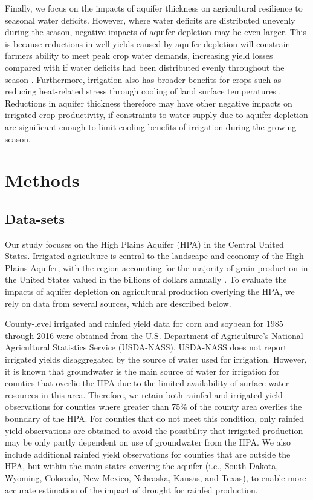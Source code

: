 \documentclass[
]{article}
\begin{document}
Finally, we focus on the impacts of aquifer thickness on agricultural resilience to seasonal water deficits. However, where water deficits are distributed unevenly during the season, negative impacts of aquifer depletion may be even larger. This is because reductions in well yields caused by aquifer depletion will constrain farmers ability to meet peak crop water demands, increasing yield losses compared with if water deficits had been distributed evenly throughout the season \citep{ortiz2019unpacking}. Furthermore, irrigation also has broader benefits for crops such as reducing heat-related stress through cooling of land surface temperatures \citep{adegoke2003impact, bonfils2007empirical, lobell2008effect, zhu2022untangling}. Reductions in aquifer thickness therefore may have other negative impacts on irrigated crop productivity, if constraints to water supply due to aquifer depletion are significant enough to limit cooling benefits of irrigation during the growing season.

\hypertarget{methods}{%
\section{Methods}\label{methods}}

\hypertarget{data-sets}{%
\subsection{Data-sets}\label{data-sets}}

Our study focuses on the High Plains Aquifer (HPA) in the Central United States. Irrigated agriculture is central to the landscape and economy of the High Plains Aquifer, with the region accounting for the majority of grain production in the United States valued in the billions of dollars annually \citep[ \citet{smidt2016complex}]{fenichel2016measuring}. To evaluate the impacts of aquifer depletion on agricultural production overlying the HPA, we rely on data from several sources, which are described below.

County-level irrigated and rainfed yield data for corn and soybean for 1985 through 2016 were obtained from the U.S. Department of Agriculture's National Agricultural Statistics Service (USDA-NASS). USDA-NASS does not report irrigated yields disaggregated by the source of water used for irrigation. However, it is known that groundwater is the main source of water for irrigation for counties that overlie the HPA due to the limited availability of surface water resources in this area. Therefore, we retain both rainfed and irrigated yield observations for counties where greater than 75\% of the county area overlies the boundary of the HPA. For counties that do not meet this condition, only rainfed yield observations are obtained to avoid the possibility that irrigated production may be only partly dependent on use of groundwater from the HPA. We also include additional rainfed yield observations for counties that are outside the HPA, but within the main states covering the aquifer (i.e., South Dakota, Wyoming, Colorado, New Mexico, Nebraska, Kansas, and Texas), to enable more accurate estimation of the impact of drought for rainfed production.
\end{document}
